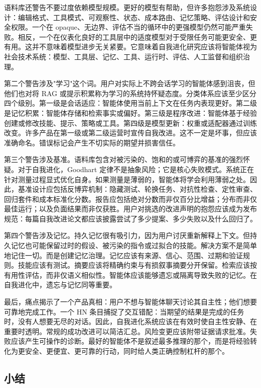 语料库还警告不要过度依赖模型规模。更好的模型有帮助，但许多抱怨涉及系统设计：编辑格式、工具模式、可观察性、状态、成本路由、记忆策略、评估设计和安全权限。一个在 opaque、无边界、评估不当的循环中的更强模型仍然可能严重失败。相反，一个在仪表化良好的工具层中的适度模型对于受限任务可能更安全、更有用。这并不意味着模型进步无关紧要。它意味着自我进化研究应该将智能体视为社会技术系统：模型、工具层、记忆、工具、运行时、评估、人工监督和组织治理。

第二个警告涉及"学习"这个词。用户对实际上不跨会话学习的智能体感到沮丧，但他们也对将 RAG 或提示积累称为学习的系统持怀疑态度。分类体系应该至少区分四个级别。第一级是会话适应：智能体使用当前上下文在任务内表现更好。第二级是记忆积累：智能体存储和检索事实或偏好。第三级是程序改进：智能体基于经验创建或修改技能、提示、策略或工具。第四级是模型更新：权重或适配器通过训练改变。许多产品在第一级或第二级运营时宣传自我改进。这不一定是坏事，但应该准确命名。错误标记会产生不切实际的期望并损害信任。

第三个警告涉及基准。语料库包含对被污染的、饱和的或可博弈的基准的强烈怀疑。对于自我进化，Goodhart 定律不是抽象风险；它是核心失败模式。系统正在针对测量过程显式优化自身。如果测量是薄弱的，智能体将学会利用薄弱之处。因此，基准设计应包括反博弈机制：隐藏测试、轮换任务、对抗性检查、定性审查、回归套件和成本标准化分数。报告应包括绝对分数而非仅百分比增益；分布而非仅最佳运行；以及负面结果而非仅获胜。用户对挑选的改进声明的抱怨应该成为发布规范：每篇自我改进论文都应该披露尝试了多少提案、多少失败以及什么回归了。

第四个警告涉及记忆。持久记忆很有吸引力，因为用户讨厌重新解释上下文。但持久记忆也可能保留过时的假设、被污染的指令或过拟合的技能。解决方案不是简单地记住一切。而是创建记忆治理。记忆应该有来源、信心、范围、过期和验证规则。技能应该有测试。摘要应该将精确约束与有损叙事摘要分开保留。检索应该按有用性评估，而非仅语义相似性。智能体应该能够遗忘或隔离导致失败的记忆。在自我进化中，遗忘与记忆同等重要。

最后，痛点揭示了一个产品真相：用户不想与智能体聊天讨论其自主性；他们想要可靠地完成工作。一个 HN 条目捕捉了交互错配：当期望的结果是完成的任务时，没有人想要无尽的对话。因此，自我进化系统应该在有效时使自主性安静、在重要时透明。常规的成功改进可以简洁汇总。风险变更应该附带证据请求批准。失败应该产生可操作的诊断。最好的智能体不是叙述最多推理的那个，而是将经验转化为更安全、更便宜、更可靠的行动，同时给人类正确控制杠杆的那个。

\subsection{小结}
\label{subsec:painpoints-summary}

